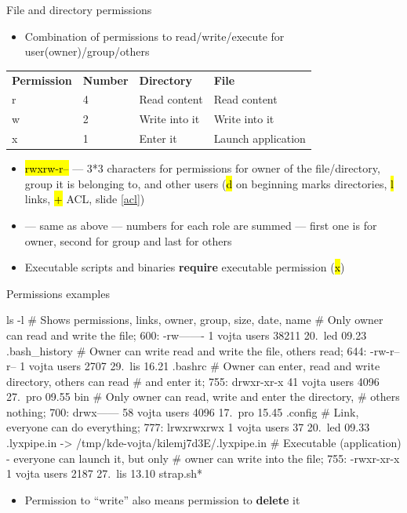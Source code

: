 \documentclass[compress, ucs, xelatex, 11pt, xcolor=svgnames,
  hyperref={
    bookmarks=true,
    unicode=true,
    colorlinks=true,
    pdftitle={Linux, command line and MetaCentrum},
    plainpages=false,
    pdfauthor={Vojtech Zeisek},
    pdfsubject={Course about use of Linux command line, writing shell scripts and using MetaCentrum of CESNET},
    pdfcreator={XeLaTeX},
    pdfkeywords={Linux, GNU, BASH, shell, command line, MetaCentrum},
    linkcolor=DarkRed,
    anchorcolor=DarkBlue,
    citecolor=Indigo,
    filecolor=NavyBlue,
    menucolor=DarkMagenta,
    urlcolor=DarkBlue,
    pdftex},
  url={hyphens, lowtilde} %
  ]{beamer}
\renewcommand{\texttt}[1]{\hl{\ttfamily #1}}
\begin{document}
\begin{frame}{File and directory permissions}
  \label{permissions}
  \begin{itemize}
    \item Combination of permissions to read/write/execute for user(owner)/group/others
  \end{itemize}
  \begin{center}
    \begin{tabular}{llll}
      \textbf{Permission} & \textbf{Number} & \textbf{Directory} & \textbf{File}\\
      r & 4 & Read content & Read content\\
      w & 2 & Write into it & Write into it\\
      x & 1 & Enter it & Launch application
    \end{tabular}
  \end{center}
  \begin{itemize}
    \item \texttt{rwxrw-r--} --- 3*3 characters for permissions for owner of the file/directory, group it is belonging to, and other users (\texttt{d} on beginning marks directories, \texttt{l} links, \texttt{+} ACL, slide \ref{acl})
    \item \texttt{764} --- same as above --- numbers for each role are summed --- first one is for owner, second for group and last for others
    \item Executable scripts and binaries \textbf{require} executable permission (\texttt{x})
  \end{itemize}
\end{frame}

\begin{frame}[fragile]{Permissions examples}
  \begin{bashcode}
    ls -l # Shows permissions, links, owner, group, size, date, name
    # Only owner can read and write the file; 600:
    -rw-------   1 vojta users   38211 20. led 09.23 .bash_history
    # Owner can write read and write the file, others read; 644:
    -rw-r--r--   1 vojta users    2707 29. lis 16.21 .bashrc
    # Owner can enter, read and write directory, others can read
    # and enter it; 755:
    drwxr-xr-x  41 vojta users    4096 27. pro 09.55 bin
    # Only owner can read, write and enter the directory,
    # others nothing; 700:
    drwx------  58 vojta users    4096 17. pro 15.45 .config
    # Link, everyone can do everything; 777:
    lrwxrwxrwx   1 vojta users      37 20. led 09.33 .lyxpipe.in ->
      /tmp/kde-vojta/kilemj7d3E/.lyxpipe.in
    # Executable (application) - everyone can launch it, but only
    # owner can write into the file; 755:
    -rwxr-xr-x   1 vojta users    2187 27. lis 13.10 strap.sh*
  \end{bashcode}
  \vfil
  \begin{itemize}
    \item Permission to ``write'' also means permission to \textbf{delete} it
  \end{itemize}
\end{frame}
\end{document}
